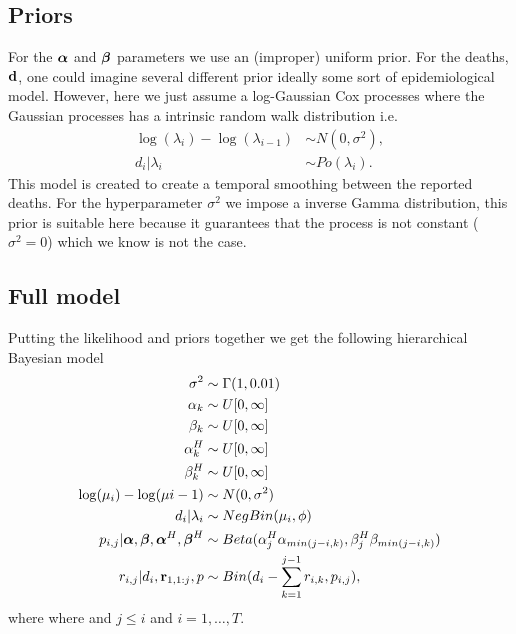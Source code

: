 \subsection{Priors}
For the ${\boldsymbol{\mathrm{\alpha}}}$ and ${\boldsymbol{\mathrm{\beta}}}$ parameters we use an (improper) uniform prior. For the deaths, ${\boldsymbol{\mathrm{d}}}$, one could imagine several different prior ideally some sort of epidemiological model. However, here we just assume a log-Gaussian Cox processes \cite{Moller1998_log_gaussian} where the Gaussian processes has a intrinsic random walk distribution \cite{Rue2005_gaussian_markov} i.e.
\begin{align*}
\log(\lambda_i) - \log(\lambda_{i-1}) &\sim N(0,\sigma^2),\\
d_i| \lambda_i  &\sim Po(\lambda_i).
\end{align*}
This model is created to create a temporal smoothing between the reported deaths.
For the hyperparameter $\sigma^2$ we impose a inverse Gamma distribution, this prior is suitable here because it guarantees that the process is not constant ($\sigma^2=0$) which we know is not the case.
\subsection{Full model}
Putting the likelihood and priors together we get the following hierarchical Bayesian model
\begin{align*}
\sigma^2 &\sim \Gamma(1,0.01) \\
\alpha_k &\sim U[0,\infty] \\
\beta_k &\sim U[0,\infty] \\
\alpha_k^H &\sim U[0,\infty] \\
\beta_k^H &\sim U[0,\infty] \\
\log(\mu_i) - \log(\mu{i-1}) &\sim N(0,\sigma^2)\\
d_i| \lambda_i  &\sim NegBin(\mu_i,\phi) \\
p_{i,j}|  {\boldsymbol{\mathrm{\alpha}}},{\boldsymbol{\mathrm{\beta}}}, {\boldsymbol{\mathrm{\alpha}}}^H,{\boldsymbol{\mathrm{\beta}}}^H &\sim Beta(\alpha^H_j\alpha_{min(j-i,k)},\beta^H_j\beta_{min(j-i,k)}) \\
r_{i,j}|d_i,{\boldsymbol{\mathrm{r}}}_{1,1:j},p &\sim Bin(d_i - \sum_{k=1}^{j-1}r_{i,k}, p_{i,j}),
\end{align*}
where where and $j\leq i$ and $i=1,\ldots,T$.

